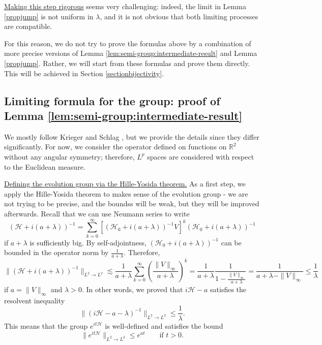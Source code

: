 \documentclass[11 pt]{amsart}
\theoremstyle{definition}
\theoremstyle{remark}
\numberwithin{equation}{section}
\begin{document}
\underline{Making this step rigorous} seems very challenging: indeed, the limit in Lemma \ref{propjump} is not uniform in $\lambda$, and it is not obvious that both limiting processes are compatible.

For this reason, we do not try to prove the formulas above by a combination of more precise versions of Lemma \ref{lem:semi-group:intermediate-result} and Lemma \ref{propjump}. Rather, we will start from these formulas and prove them directly. This will be achieved in Section \ref{sectionbijectivity}.

\subsection{Limiting formula for the group: proof of Lemma \ref{lem:semi-group:intermediate-result}}

\label{ecureuil1}

We mostly follow Krieger and Schlag \cite{KriegerSchlag}, but we provide the details since they differ significantly. For now, we consider the operator defined on functions on $\mathbb{R}^2$ without any angular symmetry; therefore, $L^p$ spaces are considered with respect to the Euclidean measure.

\medskip
\noindent
\underline{Defining the evolution group via the Hille-Yosida theorem.} As a first step, we apply the Hille-Yosida theorem to makes sense of the evolution group - we are not trying to be precise, and the boundss will be weak, but they will be improved afterwards. Recall that we can use Neumann series to write
\begin{equation*}
(\mathcal{H} + i (a + \lambda))^{-1} 
= \sum_{k=0}^\infty \left[ (\mathcal{H}_0 + i(a +\lambda))^{-1}  V \right]^k (\mathcal{H}_0 + i(a +\lambda))^{-1}
\end{equation*}
if $a+\lambda$ is sufficiently big. By self-adjointness, $(\mathcal{H}_0 + i(a +\lambda))^{-1}$ can be bounded in the operator norm by $\frac{1}{a+\lambda}$. Therefore,
$$
\|(\mathcal{H} + i (a + \lambda))^{-1} \|_{L^2 \to L^2} \lesssim \frac{1}{a+\lambda}\sum_{k=0}^\infty \left(\frac{\|V\|_{\infty}}{a+\lambda} \right)^k= \frac{1}{a+\lambda} \frac{1}{1-\frac{\|V\|_{\infty}}{a+\lambda}} = \frac{1}{a+\lambda -\|V\|_{\infty} } \leq \frac{1}{\lambda}
$$
if $a=\|V\|_\infty$ and $\lambda>0$. In other words, we proved that $i \mathcal{H} - a$ satisfies the resolvent inequality
$$
\|(i \mathcal{H} - a - \lambda)^{-1} \|_{L^2 \to L^2} \leq \frac{1}{\lambda}.
$$
This means that the group $e^{it\mathcal{H}}$ is well-defined and satisfies the bound
$$
\| e^{it\mathcal{H}} \|_{L^2 \to L^2} \leq e^{at} \qquad \mbox{if $t>0$}.
$$
\end{document}
